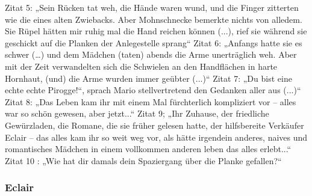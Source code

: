 Zitat 5: „Sein Rücken tat weh, die Hände waren wund, und die Finger zitterten wie die eines alten Zwiebacks. Aber Mohnschnecke bemerkte nichts von alledem. Sie Rüpel hätten mir ruhig mal die Hand reichen können (...), rief sie während sie geschickt auf die Planken der Anlegestelle sprang“
Zitat 6: „Anfangs hatte sie es schwer (…) und dem Mädchen (taten) abends die Arme unerträglich weh. Aber mit der Zeit verwandelten sich die Schwielen an den Handflächen in harte Hornhaut, (und) die Arme wurden immer geübter (...)“
Zitat 7: „Du bist eine echte echte Pirogge!“, sprach Mario stellvertretend den Gedanken aller aus (...)“
Zitat 8: „Das Leben kam ihr mit einem Mal fürchterlich kompliziert vor – alles war so schön gewesen, aber jetzt...“
Zitat 9; „Ihr Zuhause, der friedliche Gewürzladen, die Romane, die sie früher gelesen hatte, der hilfsbereite Verkäufer Eclair – das alles kam ihr so weit weg vor, als hätte irgendein anderes, naives und romantisches Mädchen in einem vollkommen anderen leben das alles erlebt...“
Zitat 10 : „Wie hat dir damals dein Spaziergang über die Planke gefallen?“


\subsubsection{Eclair}


